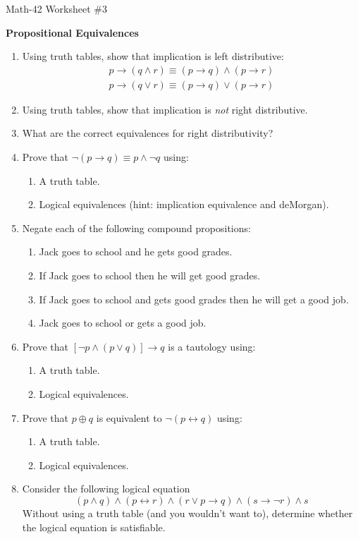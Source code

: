 \documentclass[letterpaper,12pt,fleqn]{article}
\renewcommand{\implies}{\rightarrow}
\renewcommand{\iff}{\leftrightarrow}
\begin{document}
\begin{center}
  \large Math-42 Worksheet \#3

  \textbf{Propositional Equivalences}
\end{center}

\vspace{0.5in}

\begin{enumerate}[left=0in,itemsep=0.5in]
\item Using truth tables, show that implication is left distributive:
  \begin{gather*}
    p\implies(q\land r)\equiv(p\implies q)\land(p\implies r) \\
    p\implies(q\lor r)\equiv(p\implies q)\lor(p\implies r)
  \end{gather*}
\item Using truth tables, show that implication is \emph{not} right distributive.
\item What are the correct equivalences for right distributivity?

\item Prove that \(\lnot(p\implies q)\equiv p\land\lnot q\) using:
  \begin{enumerate}
  \item A truth table.
  \item Logical equivalences (hint: implication equivalence and deMorgan).
  \end{enumerate}

\item Negate each of the following compound propositions:
  \begin{enumerate}
  \item Jack goes to school and he gets good grades.
  \item If Jack goes to school then he will get good grades.
  \item If Jack goes to school and gets good grades then he will get a good job.
  \item Jack goes to school or gets a good job.
  \end{enumerate}

\item Prove that \([\lnot p\land(p\lor q)]\implies q\) is a tautology using:
  \begin{enumerate}
  \item A truth table.
  \item Logical equivalences.
  \end{enumerate}

\item Prove that \(p\oplus q\) is equivalent to \(\lnot(p\iff q)\) using:
  \begin{enumerate}
  \item A truth table.
  \item Logical equivalences.
  \end{enumerate}

\item Consider the following logical equation
  \[(p\land q)\land(p\iff r)\land(r\lor p\implies q)\land(s\implies\lnot r)\land s\]
  Without using a truth table (and you wouldn't want to), determine whether the logical equation is satisfiable.
\end{enumerate}
\end{document}
